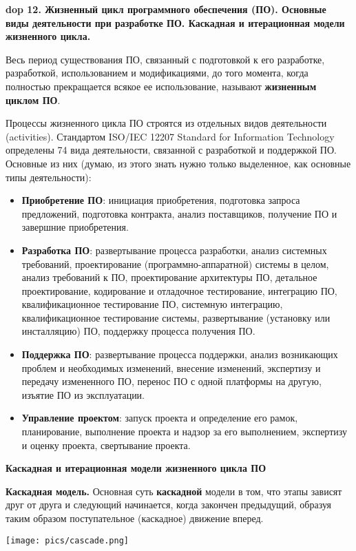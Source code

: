 \textbf{\LARGE dop 12. Жизненный  цикл  программного  обеспечения  (ПО).  Основные  виды  деятельности  при  разработке  ПО. Каскадная и итерационная модели жизненного цикла.}

Весь период существования ПО, связанный с подготовкой к его разработке, разработкой, использованием и модификациями, до того момента, когда полностью прекращается всякое ее использование, называют \textbf{жизненным циклом ПО}.

Процессы жизненного цикла ПО строятся из отдельных видов деятельности (activities).
Стандартом ISO/IEC 12207 Standard for Information Technology определены 74 вида деятельности, связанной с разработкой и поддержкой ПО.
Основные из них (думаю, из этого знать нужно только выделенное, как основные типы деятельности):
\begin{itemize}
    \item \textbf{Приобретение ПО}: инициация приобретения, подготовка запроса предложений, подготовка контракта, анализ поставщиков, получение ПО и завершние приобретения.
    \item \textbf{Разработка ПО}: развертывание процесса разработки, анализ системных требований, проектирование (программно-аппаратной) системы в целом, анализ требований к ПО, проектирование архитектуры ПО, детальное проектирование, кодирование и отладочное тестирование, интеграцию ПО, квалификационное тестирование ПО, системную интеграцию, квалификационное тестирование системы, развертывание (установку или инсталляцию) ПО, поддержку процесса получения ПО.
    \item \textbf{Поддержка ПО}: развертывание процесса поддержки, анализ возникающих проблем и необходимых изменений, внесение изменений, экспертизу и передачу измененного ПО, перенос ПО с одной платформы на другую, изъятие ПО из эксплуатации.
    \item \textbf{Управление проектом}: запуск проекта и определение его рамок, планирование, выполнение проекта и надзор за его выполнением, экспертизу и оценку проекта, свертывание проекта.
\end{itemize}

\textbf{Каскадная и итерационная модели жизненного цикла ПО}

\textbf{Каскадная модель.} Основная суть \textbf{каскадной} модели в том, что этапы зависят друг от друга и следующий начинается, когда закончен предыдущий, образуя таким образом поступательное (каскадное) движение вперед. 

\texttt{[image: pics/cascade.png]}

